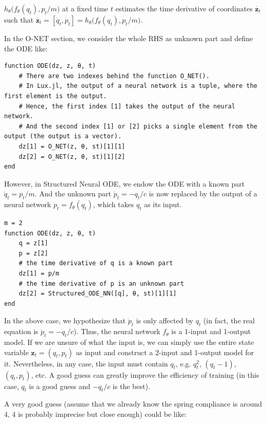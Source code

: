 \documentclass[
	parskip, 			   %
	twoside, 			   %
	DIV=14, 			   %
	BCOR=15.0mm, 		   %
	headsepline, 		   %
	open=right, 		   %
	captions=tableheading, %
	bibliography=totoc,    %
	numbers=noenddot       %
]{scrreprt}
\begin{document}
$h_{\theta} \big(f_{\theta}(q_t), p_t/m \big)$ at a fixed time $t$ estimates the time derivative of coordinates $\dot{\mathbf{z}_{t}}$ such that $\dot{\mathbf{z}_{t}} = [\dot{q}_{t}, \dot{p}_{t}] = h_{\theta} \big(f_{\theta}(q_t), p_t/m \big)$.

In the O-NET section, we consider the whole RHS as unknown part and define the ODE like:
\begin{verbatim}
function ODE(dz, z, θ, t)
    # There are two indexes behind the function O_NET().
    # In Lux.jl, the output of a neural network is a tuple, where the first element is the output.
    # Hence, the first index [1] takes the output of the neural network.
    # And the second index [1] or [2] picks a single element from the output (the output is a vector).
    dz[1] = O_NET(z, θ, st)[1][1]
    dz[2] = O_NET(z, θ, st)[1][2]
end
\end{verbatim}

However, in Structured Neural ODE, we endow the ODE with a known part $\dot{q}_t = p_t/m$. And the unknown part $\dot{p}_t = -q_t/c$ is now replaced by the output of a neural network $\dot{p}_t = f_{\theta}(q_t)$, which takes $q_t$ as its input.

\begin{verbatim}
m = 2
function ODE(dz, z, θ, t)
    q = z[1]
    p = z[2]
    # the time derivative of q is a known part
    dz[1] = p/m
    # the time derivative of p is an unknown part
    dz[2] = Structured_ODE_NN([q], θ, st)[1][1]
end
\end{verbatim}

In the above case, we hypothesize that $\Dot{p}_t$ is only affected by $q_t$ (in fact, the real equation is $\dot{p}_t = -q_t/c$). Thus, the neural network $f_{\theta}$ is a 1-input and 1-output model. If we are unsure of what the input is, we can simply use the entire state variable $\mathbf{z}_t = (q_t, p_t)$ as input and construct a 2-input and 1-output model for it. Nevertheless, in any case, the input must contain $q_t$, e.g. $q_t^2$, $(q_t-1)$, $(q_t, p_t)$, etc. A good guess can greatly improve the efficiency of training (in this case, $q_t$ is a good guess and $-q_t/c$ is the best). 

A very good guess (assume that we already know the spring compliance is around 4, 4 is probably imprecise but close enough) could be like:
\end{document}
